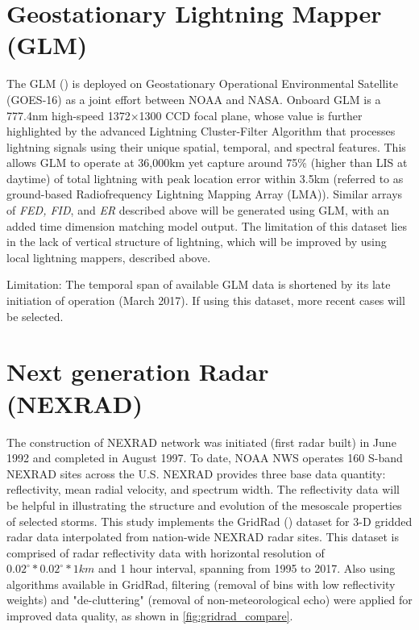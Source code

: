 \section{Geostationary Lightning Mapper (GLM)}
The GLM (\cite{goodman2013goes}) is deployed on Geostationary Operational Environmental Satellite (GOES-16) as a joint effort between NOAA and NASA. Onboard GLM is a 777.4nm high-speed  1372$\times$1300 CCD focal plane, whose value is further highlighted by the advanced Lightning Cluster-Filter Algorithm that processes lightning signals using their unique spatial, temporal, and spectral features. This allows GLM to operate at 36,000km yet capture around 75\% (higher than LIS at daytime) of total lightning with peak location error within 3.5km (referred to as ground-based Radiofrequency Lightning Mapping Array (LMA)). Similar arrays of \textit{FED, FID}, and \textit{ER} described above will be generated using GLM, with an added time dimension matching model output. The limitation of this dataset lies in the lack of vertical structure of lightning, which will be improved by using local lightning mappers, described above.

Limitation: The temporal span of available GLM data is shortened by its late initiation of operation (March 2017). If using this dataset, more recent cases will be selected.
\section{Next generation Radar (NEXRAD)}
The construction of NEXRAD network was initiated (first radar built) in June 1992 and completed in August 1997. To date, NOAA NWS operates 160 S-band NEXRAD sites across the U.S. NEXRAD provides three base data quantity: reflectivity, mean radial velocity, and spectrum width. The reflectivity data will be helpful in illustrating the structure and evolution of the mesoscale properties of selected storms. This study implements the GridRad (\cite{Bowman2017}) dataset for 3-D gridded radar data interpolated from nation-wide NEXRAD radar sites. This dataset is comprised of radar reflectivity data with horizontal resolution of $0.02^{\circ}*0.02^{\circ}*1km$ and 1 hour interval, spanning from 1995 to 2017. Also using algorithms available in GridRad, filtering (removal of bins with low reflectivity weights) and "de-cluttering" (removal of non-meteorological echo) were applied for improved data quality, as shown in \ref{fig:gridrad_compare}.

